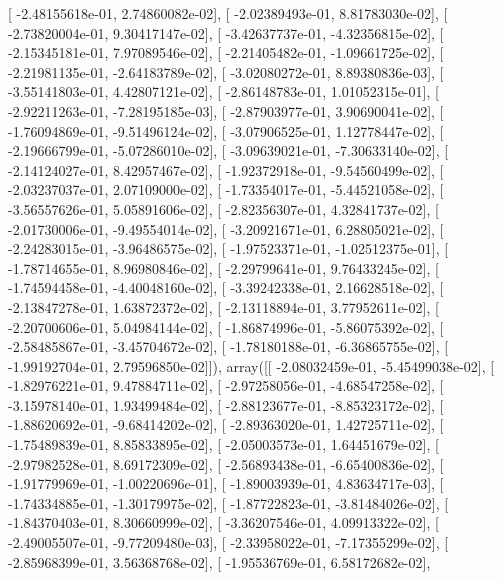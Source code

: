 \documentclass{article}
\begin{document}
       [ -2.48155618e-01,   2.74860082e-02],
       [ -2.02389493e-01,   8.81783030e-02],
       [ -2.73820004e-01,   9.30417147e-02],
       [ -3.42637737e-01,  -4.32356815e-02],
       [ -2.15345181e-01,   7.97089546e-02],
       [ -2.21405482e-01,  -1.09661725e-02],
       [ -2.21981135e-01,  -2.64183789e-02],
       [ -3.02080272e-01,   8.89380836e-03],
       [ -3.55141803e-01,   4.42807121e-02],
       [ -2.86148783e-01,   1.01052315e-01],
       [ -2.92211263e-01,  -7.28195185e-03],
       [ -2.87903977e-01,   3.90690041e-02],
       [ -1.76094869e-01,  -9.51496124e-02],
       [ -3.07906525e-01,   1.12778447e-02],
       [ -2.19666799e-01,  -5.07286010e-02],
       [ -3.09639021e-01,  -7.30633140e-02],
       [ -2.14124027e-01,   8.42957467e-02],
       [ -1.92372918e-01,  -9.54560499e-02],
       [ -2.03237037e-01,   2.07109000e-02],
       [ -1.73354017e-01,  -5.44521058e-02],
       [ -3.56557626e-01,   5.05891606e-02],
       [ -2.82356307e-01,   4.32841737e-02],
       [ -2.01730006e-01,  -9.49554014e-02],
       [ -3.20921671e-01,   6.28805021e-02],
       [ -2.24283015e-01,  -3.96486575e-02],
       [ -1.97523371e-01,  -1.02512375e-01],
       [ -1.78714655e-01,   8.96980846e-02],
       [ -2.29799641e-01,   9.76433245e-02],
       [ -1.74594458e-01,  -4.40048160e-02],
       [ -3.39242338e-01,   2.16628518e-02],
       [ -2.13847278e-01,   1.63872372e-02],
       [ -2.13118894e-01,   3.77952611e-02],
       [ -2.20700606e-01,   5.04984144e-02],
       [ -1.86874996e-01,  -5.86075392e-02],
       [ -2.58485867e-01,  -3.45704672e-02],
       [ -1.78180188e-01,  -6.36865755e-02],
       [ -1.99192704e-01,   2.79596850e-02]]), array([[ -2.08032459e-01,  -5.45499038e-02],
       [ -1.82976221e-01,   9.47884711e-02],
       [ -2.97258056e-01,  -4.68547258e-02],
       [ -3.15978140e-01,   1.93499484e-02],
       [ -2.88123677e-01,  -8.85323172e-02],
       [ -1.88620692e-01,  -9.68414202e-02],
       [ -2.89363020e-01,   1.42725711e-02],
       [ -1.75489839e-01,   8.85833895e-02],
       [ -2.05003573e-01,   1.64451679e-02],
       [ -2.97982528e-01,   8.69172309e-02],
       [ -2.56893438e-01,  -6.65400836e-02],
       [ -1.91779969e-01,  -1.00220696e-01],
       [ -1.89003939e-01,   4.83634717e-03],
       [ -1.74334885e-01,  -1.30179975e-02],
       [ -1.87722823e-01,  -3.81484026e-02],
       [ -1.84370403e-01,   8.30660999e-02],
       [ -3.36207546e-01,   4.09913322e-02],
       [ -2.49005507e-01,  -9.77209480e-03],
       [ -2.33958022e-01,  -7.17355299e-02],
       [ -2.85968399e-01,   3.56368768e-02],
       [ -1.95536769e-01,   6.58172682e-02],
\end{document}
